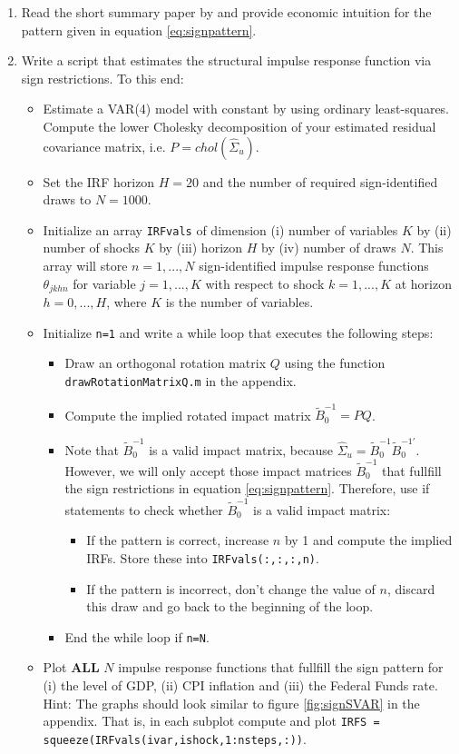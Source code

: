 \documentclass{article}
\begin{document}
\begin{enumerate}
\item Read the short summary paper by \textcite{Wolf_2022_WhatCanWe} and provide economic intuition for the pattern given in equation \eqref{eq:signpattern}.
\item Write a script that estimates the structural impulse response function via sign restrictions.
To this end:
	\begin{itemize}
	\item Estimate a VAR(4) model with constant by using ordinary least-squares.
	Compute the lower Cholesky decomposition of your estimated residual covariance matrix, i.e. $P=chol(\hat{\Sigma}_u)$.
	\item Set the IRF horizon $H=20$ and the number of required sign-identified draws to $N=1000$.
	\item Initialize an array \texttt{IRFvals} of dimension
	(i) number of variables $K$ by (ii) number of shocks $K$ by (iii) horizon $H$ by (iv) number of draws $N$.
	This array will store $n=1,...,N$ sign-identified impulse response functions $\theta_{jkhn}$ for variable $j=1,...,K$
	with respect to shock $k=1,...,K$ at horizon $h=0,...,H$, where $K$ is the number of variables.
	
	\item Initialize \texttt{n=1} and write a while loop that executes the following steps:
		\begin{itemize}
		\item Draw an orthogonal rotation matrix $Q$ using the function \texttt{drawRotationMatrixQ.m} in the appendix.
		\item Compute the implied rotated impact matrix $\widetilde{B}_0^{-1}=PQ$.
		\item Note that $\widetilde{B}_0^{-1}$ is a valid impact matrix, because $\hat{\Sigma}_u = \widetilde{B}_0^{-1} \widetilde{B}_0^{-1'}$.
		However, we will only accept those impact matrices $\widetilde{B}_0^{-1}$ that fullfill the sign restrictions in equation \eqref{eq:signpattern}.
		Therefore, use if statements to check whether $\widetilde{B}_0^{-1}$ is a valid impact matrix:
		\begin{itemize}
			\item If the pattern is correct, increase $n$ by 1 and compute the implied IRFs. Store these into \texttt{IRFvals(:,:,:,n)}.
			\item If the pattern is incorrect, don't change the value of $n$, discard this draw and go back to the beginning of the loop.
			\end{itemize}
		\item End the while loop if \texttt{n=N}.
		\end{itemize}
	\item Plot \textbf{ALL} $N$ impulse response functions that fullfill the sign pattern for (i) the level of GDP, (ii) CPI inflation and (iii) the Federal Funds rate.
	\\Hint: The graphs should look similar to figure \ref{fig:signSVAR} in the appendix.
	That is, in each subplot compute and plot \texttt{IRFS = squeeze(IRFvals(ivar,ishock,1:nsteps,:))}.	
	\end{itemize}
\end{enumerate}
\end{document}
